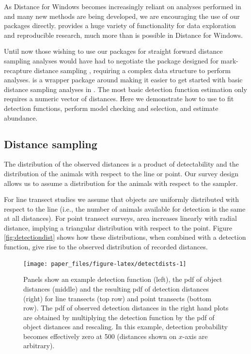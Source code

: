 \documentclass[article]{jss}
\begin{document}
As Distance for Windows becomes increasingly reliant on analyses
performed in  and many new methods are being developed, we
are encouraging the use of our  packages directly.
 provides a huge variety of functionality for data
exploration and reproducible research, much more than is possible in
Distance for Windows.

Until now those wishing to use our  packages for straight
forward distance sampling analyses would have had to negotiate the
package  \citep{mrds-pkg} designed for mark-recapture distance
sampling \citep{Burt:2014gu}, requiring a complex data structure to
perform analyses.  is a wrapper package around 
making it easier to get started with basic distance sampling analyses in
. The most basic detection function estimation only requires
a numeric vector of distances. Here we demonstrate how to use
 to fit detection functions, perform model checking and
selection, and estimate abundance.

\subsection{Distance sampling}\label{distance-sampling}

The distribution of the observed distances is a product of detectability
\citep[sometimes referred to as ``perception bias'';][]{Marsh:1989ho}
and the distribution of the animals with respect to the line or point.
Our survey design allows us to assume a distribution for the animals
with respect to the sampler.

For line transect studies we assume that objects are uniformly
distributed with respect to the line (i.e., the number of animals
available for detection is the same at all distances). For point
transect surveys, area increases linearly with radial distance, implying
a triangular distribution with respect to the point. Figure
\ref{fig:detectiondist} shows how these distributions, when combined
with a detection function, give rise to the observed distribution of
recorded distances.

\begin{CodeChunk}
\begin{figure}

{\centering \texttt{[image: paper\_files/figure-latex/detectdists-1]} 

}

\caption{Panels show an example detection function (left), the pdf of object distances (middle) and the resulting pdf of detection distances (right) for line transects (top row) and point transects (bottom row). The pdf of observed detection distances in the right hand plots are obtained by multiplying the detection function by the pdf of object distances and rescaling. In this example, detection probability becomes effectively zero at 500 (distances shown on $x$-axis are arbitrary). \label{fig:detectiondist}}\label{fig:detectdists}
\end{figure}
\end{CodeChunk}
\end{document}
